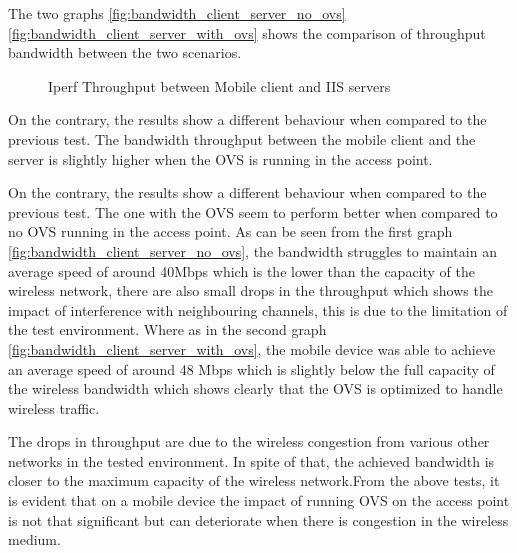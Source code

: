 The two graphs \ref{fig:bandwidth_client_server_no_ovs} \ref{fig:bandwidth_client_server_with_ovs} shows the comparison of throughput bandwidth between the two scenarios.

\begin{figure}
	\centering
	\hfill
	\caption{Iperf Throughput between Mobile client and IIS servers}
\end{figure}

On the contrary, the results show a different behaviour when compared to the previous test. The bandwidth throughput between the mobile client and the server is slightly higher when the OVS is running in the access point. 

On the contrary, the results show a different behaviour when compared to the previous test. The one with the OVS seem to perform better when compared to no OVS running in the access point. As can be seen from the first graph \ref{fig:bandwidth_client_server_no_ovs}, the bandwidth struggles to maintain an average speed of around 40Mbps which is the lower than the capacity of the wireless network, there are also small drops in the throughput which shows the impact of interference with neighbouring channels, this is due to the limitation of the test environment. Where as in the second graph \ref{fig:bandwidth_client_server_with_ovs}, the mobile device was able to achieve an average speed of around 48 Mbps which is slightly below the full capacity of the wireless bandwidth which shows clearly that the OVS is optimized to handle wireless traffic.

The drops in throughput are due to the wireless congestion from various other networks in the tested environment. In spite of that, the achieved bandwidth is closer to the maximum capacity of the wireless network.From the above tests, it is evident that on a mobile device the impact of running OVS on the access point is not that significant but can deteriorate when there is congestion in the wireless medium.

